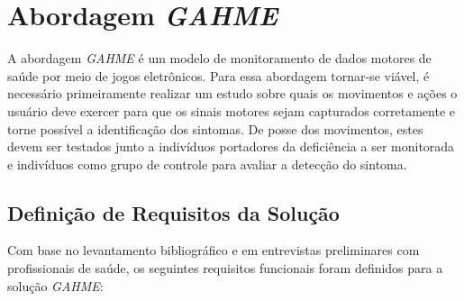 
\chapter{Abordagem \textit{GAHME}}\label{chapter:abordagem_gahme}
A abordagem \textit{GAHME} é um modelo de monitoramento de dados motores de saúde por meio de jogos eletrônicos. Para essa abordagem tornar-se viável, é necessário primeiramente realizar um estudo sobre quais os movimentos e ações o usuário deve exercer para que os sinais motores sejam capturados corretamente e torne possível a identificação dos sintomas. De posse dos movimentos, estes devem ser testados junto a indivíduos portadores da deficiência a ser monitorada e indivíduos como grupo de controle para avaliar a detecção do sintoma.


\section{Definição de Requisitos da Solução}\label{section:requisitos_solucao}
Com base no levantamento bibliográfico e em entrevistas preliminares com profissionais de saúde, os seguintes requisitos funcionais foram definidos para a solução \textit{GAHME}:

